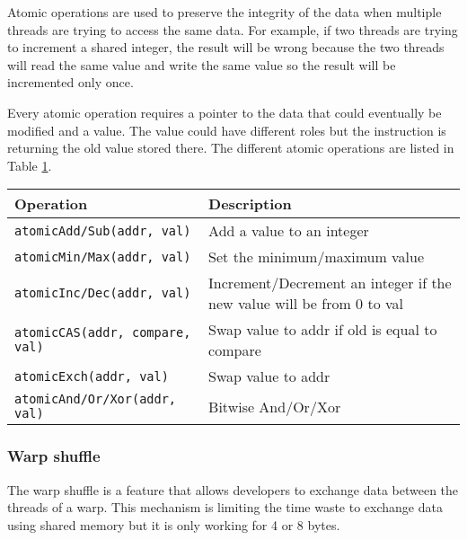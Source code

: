Atomic operations are used to preserve the integrity of the data when multiple
threads are trying to access the same data.
For example, if two threads are trying to increment a shared integer, the
result will be wrong because the two threads will read the same value and write
the same value so the result will be incremented only once.

Every atomic operation requires a pointer to the data that could eventually be
modified and a value.
The value could have different roles but the instruction is returning the old
value stored there.
The different atomic operations are listed in Table \ref{tab:analyze:cuda:synchronization:atomic}.

\begin{table}[ht]
    \centering
    \begin{tabular}{|m{}|m{}|}
        \hline
        \textbf{Operation} & \textbf{Description} \\
        \hline
        \texttt{atomicAdd/Sub(addr, val)} & Add a value to an integer \\
        \hline
        \texttt{atomicMin/Max(addr, val)} & Set the minimum/maximum value \\
        \hline
        \texttt{atomicInc/Dec(addr, val)} & Increment/Decrement an integer if the new value will be from 0 to val\\
        \hline
        \texttt{atomicCAS(addr, compare, val)} & Swap value to addr if old is equal to compare\\
        \hline
        \texttt{atomicExch(addr, val)} & Swap value to addr \\
        \hline
        \texttt{atomicAnd/Or/Xor(addr, val)} & Bitwise And/Or/Xor \\
        \hline
    \end{tabular}
    \label{tab:analyze:cuda:synchronization:atomic}
\end{table}

\subsubsection{Warp shuffle}
\label{ch:analyze:cuda:synchronization:warp-shuffle}

The warp shuffle is a feature that allows developers to exchange data between the threads
of a warp.
This mechanism is limiting the time waste to exchange data using shared memory
but it is only working for 4 or 8 bytes.

